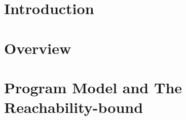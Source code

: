 \documentclass[runningheads]{llncs}
\begin{document}
\section{Introduction}
\label{sec:intro}



\section{Overview}
\label{sec:overview}


\section{Program Model and The Reachability-bound}
\label{sec:preliminary}
% 



% 
% 
\end{document}
